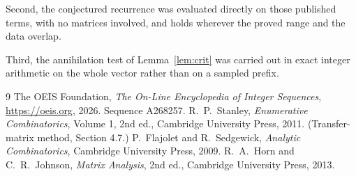 \documentclass[11pt,a4paper]{article}
\theoremstyle{plain}
\theoremstyle{definition}
\begin{document}
Second, the conjectured recurrence was evaluated directly on those published terms, with no
matrices involved, and holds wherever the proved range and the data overlap.

Third, the annihilation test of Lemma~\ref{lem:crit} was carried out in exact integer
arithmetic on the whole vector rather than on a sampled prefix.

\begin{thebibliography}{9}
 The OEIS Foundation, \emph{The On-Line Encyclopedia of Integer
Sequences}, \url{https://oeis.org}, 2026. Sequence A268257.
 R.~P.~Stanley, \emph{Enumerative Combinatorics}, Volume 1, 2nd ed.,
Cambridge University Press, 2011. (Transfer-matrix method, Section 4.7.)
 P.~Flajolet and R.~Sedgewick, \emph{Analytic Combinatorics}, Cambridge
University Press, 2009.
 R.~A.~Horn and C.~R.~Johnson, \emph{Matrix Analysis}, 2nd ed., Cambridge
University Press, 2013.
\end{thebibliography}
\end{document}
